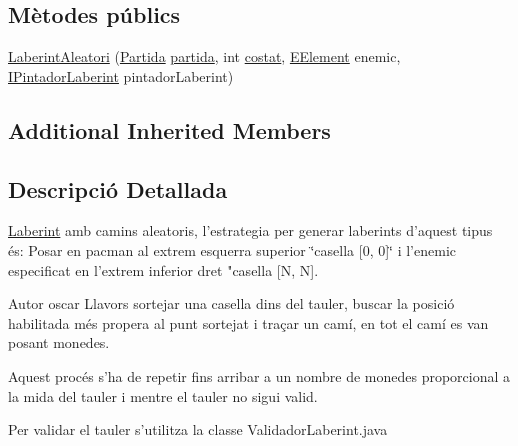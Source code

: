 \subsection*{Mètodes públics}
\begin{DoxyCompactItemize}
\item 
\hyperlink{classlogica_1_1laberints_1_1_laberint_aleatori_aafae50e4b6d51475d8e53d7fee61785b}{Laberint\+Aleatori} (\hyperlink{classlogica_1_1_partida}{Partida} \hyperlink{classlogica_1_1laberints_1_1_laberint_a7183ce070714f73e078bb36e8c21b575}{partida}, int \hyperlink{classlogica_1_1laberints_1_1_laberint_ae874ac4889592b811709f5b967d85286}{costat}, \hyperlink{enumlogica_1_1enumeracions_1_1_e_element}{E\+Element} enemic, \hyperlink{interfaceinterficie_1_1_i_pintador_laberint}{I\+Pintador\+Laberint} pintador\+Laberint)
\end{DoxyCompactItemize}
\subsection*{Additional Inherited Members}


\subsection{Descripció Detallada}
\hyperlink{classlogica_1_1laberints_1_1_laberint}{Laberint} amb camins aleatoris, l'estrategia per generar laberints d'aquest tipus és\+: Posar en pacman al extrem esquerra superior \char`\"{}casella \mbox{[}0, 0\mbox{]}\char`\"{} i l'enemic especificat en l'extrem inferior dret "casella \mbox{[}N, N\mbox{]}. 

\begin{DoxyAuthor}{Autor}
oscar Llavors sortejar una casella dins del tauler, buscar la posició habilitada més propera al punt sortejat i traçar un camí, en tot el camí es van posant monedes.
\end{DoxyAuthor}
Aquest procés s'ha de repetir fins arribar a un nombre de monedes proporcional a la mida del tauler i mentre el tauler no sigui valid.

Per validar el tauler s'utilitza la classe Validador\+Laberint.\+java 

